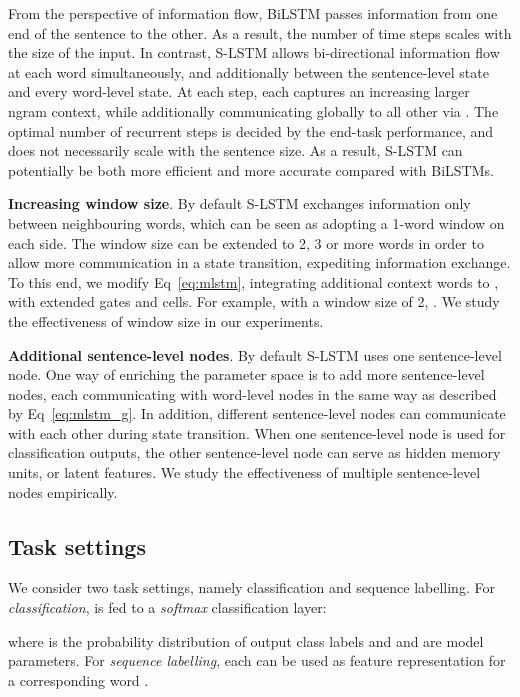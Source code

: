 \documentclass[11pt,a4paper]{article}
\begin{document}
From the perspective of information flow, BiLSTM passes information from one end of the sentence to the other. 
As a result, the number of time steps scales with the size of the input. 
In contrast, S-LSTM allows bi-directional information flow at each word simultaneously, and additionally between the sentence-level state and every word-level state. 
At each step, each  captures an increasing larger ngram context, while additionally communicating globally to all other  via .
The optimal number of recurrent steps is decided by the end-task performance, and does not necessarily scale with the sentence size. 
As a result, S-LSTM can potentially be both more efficient and more accurate compared with BiLSTMs.


{\bf Increasing window size}. 
By default S-LSTM exchanges information only between neighbouring words, which can be seen as adopting a 1-word window on each side. 
The window size can be extended to 2, 3 or more words in order to allow more communication in a state transition, expediting information exchange. 
To this end, we modify Eq~\ref{eq:mlstm}, integrating additional context words to , with extended gates and cells. 
For example, with a window size of 2, .
We study the effectiveness of window size in our experiments.


{\bf Additional sentence-level nodes}. By default S-LSTM uses one sentence-level node. 
One way of enriching the parameter space is to add more sentence-level nodes, each communicating with word-level nodes in the same way as described by Eq~\ref{eq:mlstm_g}. 
In addition, different sentence-level nodes can communicate  with each other during state transition. 
When one sentence-level node is used for classification outputs, the other sentence-level node can serve as hidden memory units, or latent features. We study the effectiveness of multiple sentence-level nodes empirically.


\subsection{Task settings}
\label{sec:ext_attn}

We consider two task settings, namely classification and sequence labelling. 
For \emph{classification},  is fed to a {\it softmax} classification layer:

where  is the probability distribution of output class labels and  and  are model parameters. 
For \emph{sequence labelling}, each  can be used as feature representation for a corresponding word .
\end{document}
